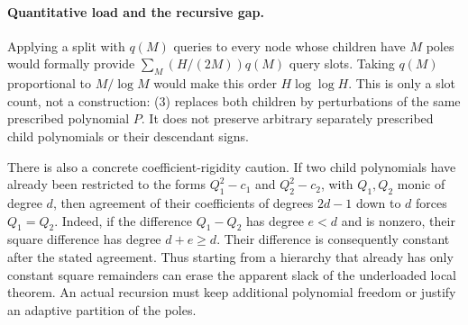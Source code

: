 \documentclass[11pt]{article}
\begin{document}
\paragraph{Quantitative load and the recursive gap.}
Applying a split with $q(M)$ queries to every node whose children
have $M$ poles would formally provide
$\sum_M (H/(2M))q(M)$ query slots. Taking $q(M)$ proportional to
$M/\log M$ would make this order $H\log\log H$. This is only a
slot count, not a construction: (3) replaces both children by
perturbations of the same prescribed polynomial $P$. It does not
preserve arbitrary separately prescribed child polynomials or their
descendant signs.

There is also a concrete coefficient-rigidity caution. If two child
polynomials have already been restricted to the forms
$Q_1^2-c_1$ and $Q_2^2-c_2$, with $Q_1,Q_2$ monic of degree $d$,
then agreement of their coefficients of degrees $2d-1$ down to $d$
forces $Q_1=Q_2$. Indeed, if the difference $Q_1-Q_2$ has degree
$e<d$ and is nonzero, their square difference has degree $d+e\geq d$.
Their difference is consequently constant after the stated agreement.
Thus starting from a hierarchy that already has only constant
square remainders can erase the apparent slack of the underloaded
local theorem. An actual recursion must keep additional polynomial
freedom or justify an adaptive partition of the poles.
\end{document}
